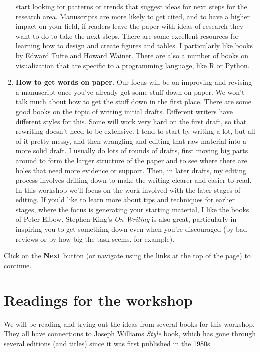 \documentclass[]{tufte-book}
\begin{document}
\begin{enumerate}
  start looking for patterns or trends that suggest ideas for next steps for the
  research area. Manuscripts are more likely to get cited, and to have a higher
  impact on your field, if readers leave the paper with ideas of research they want
  to do to take the next steps. There are some excellent resources for learning how
  to design and create figures and tables. I particularly like books by Edward Tufte
  and Howard Wainer. There are also a number of books on visualization that are
  specific to a programming language, like R or Python.
\item
  \textbf{How to get words on paper.} Our focus will be on improving and
  revising a manuscript once you've already got some stuff down on paper. We won't
  talk much about how to get the stuff down in the first place. There are some
  good books on the topic of writing initial drafts. Different writers have
  different styles for this. Some will work very hard on the first draft, so that
  rewriting doesn't need to be extensive. I tend to start by writing a lot, but
  all of it pretty messy, and then wrangling and editing that raw
  material into a more solid draft. I usually do lots of rounds of drafts,
  first moving big parts around to form the larger structure of
  the paper and to see where there are holes that need more evidence or support.
  Then, in later drafts, my editing process involves drilling down to make
  the writing clearer and easier to read. In this workshop we'll focus on the work
  involved with the later stages of editing. If you'd like to learn more about
  tips and techniques for earlier stages, where the focus is generating your
  starting material, I like the books of Peter Elbow. Stephen King's \emph{On Writing}
  is also great, particularly in inspiring you to get something down even when
  you're discouraged (by bad reviews or by how big the task seems, for example).
\end{enumerate}

Click on the \textbf{Next} button (or navigate using the
links at the top of the page) to continue.

\hypertarget{readings-for-the-workshop}{%
\section{Readings for the workshop}\label{readings-for-the-workshop}}

We will be reading and trying out the ideas from several books for this
workshop. They all have connections to Joseph Williams \emph{Style} book, which has
gone through several editions (and titles) since it was first published in the
1980s.
\end{document}
